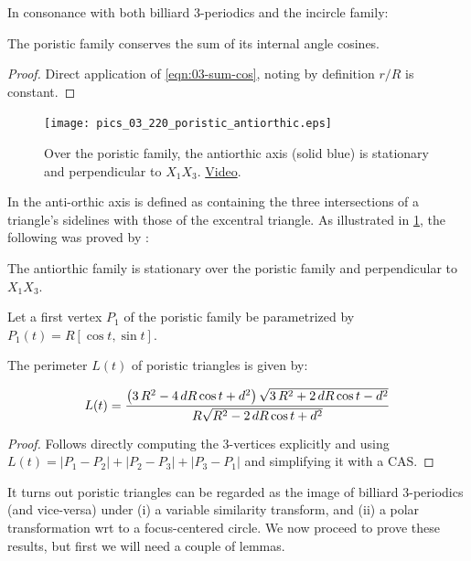 In consonance with both billiard 3-periodics and the incircle family:

\begin{proposition}
The poristic family conserves the sum of its internal angle cosines.
\end{proposition}

\begin{proof}
Direct application of \cref{eqn:03-sum-cos}, noting by definition $r/R$ is constant.
\end{proof}

\begin{figure}
    \centering
    \texttt{[image: pics\_03\_220\_poristic\_antiorthic.eps]}
    \caption{Over the poristic family, the antiorthic axis (solid blue) is stationary and perpendicular to $X_1 X_3$. \href{https://youtu.be/DS4ryndDK6Q}{Video}.}
    \label{fig:03-antiorthic}
\end{figure}

In \cite[Antiorthic axis]{mw} the anti-orthic axis is defined as containing the three intersections of a triangle's sidelines with those of the excentral triangle. As illustrated in \cref{fig:03-antiorthic}, the following was proved by \cite{weaver1927-poristic}:

\begin{proposition}
The antiorthic family is stationary over the poristic family and perpendicular to $X_1 X_3$.
\label{prop:03-antiorthic}
\end{proposition}

Let a first vertex $P_1$ of the poristic family be parametrized by $P_1(t)=R[\cos{t},\sin{t}]$.

\begin{proposition}
The perimeter $L(t)$ of poristic triangles is given by:

\begin{equation*}
L(t)=\frac {\left(3\,{R}^{2}
-4\,dR\cos t  +{d}^{2} \right)\sqrt{3\,{R}^{2}+2\,dR\cos t  -{d}^{2}}  }{R\sqrt {{R}^{2}-2\,dR
\cos t  +{d}^{2}}}\\
\end{equation*}
\end{proposition}
\begin{proof}
Follows directly computing the 3-vertices explicitly and using $L(t)=|P_1-P_2|+|P_2-P_3|+|P_3-P_1|$ and simplifying it with a CAS.  
\end{proof}

It turns out poristic triangles can be regarded as the image of billiard 3-periodics (and vice-versa) under (i) a variable similarity transform, and (ii) a polar transformation wrt to a focus-centered circle. We now proceed to prove these results, but first we will need a couple of lemmas.

